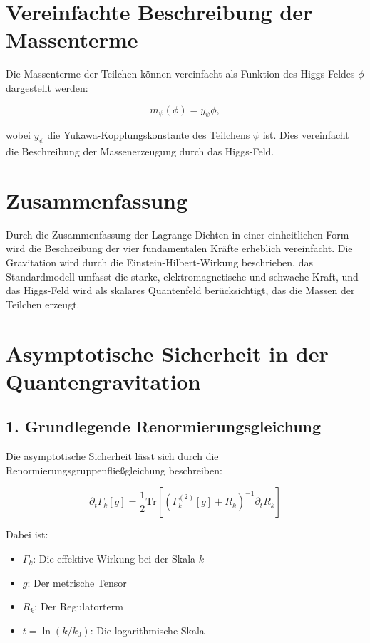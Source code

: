 \documentclass{article}
\begin{document}
	\section{Vereinfachte Beschreibung der Massenterme}
	
	Die Massenterme der Teilchen können vereinfacht als Funktion des Higgs-Feldes $\phi$ dargestellt werden:
	
	\begin{equation}
		m_\psi(\phi) = y_\psi \phi,
	\end{equation}
	
	wobei $y_\psi$ die Yukawa-Kopplungskonstante des Teilchens $\psi$ ist. Dies vereinfacht die Beschreibung der Massenerzeugung durch das Higgs-Feld.
	
	\section{Zusammenfassung}
	
	Durch die Zusammenfassung der Lagrange-Dichten in einer einheitlichen Form wird die Beschreibung der vier fundamentalen Kräfte erheblich vereinfacht. Die Gravitation wird durch die Einstein-Hilbert-Wirkung beschrieben, das Standardmodell umfasst die starke, elektromagnetische und schwache Kraft, und das Higgs-Feld wird als skalares Quantenfeld berücksichtigt, das die Massen der Teilchen erzeugt.
\section{Asymptotische Sicherheit in der Quantengravitation}

\subsection{1. Grundlegende Renormierungsgleichung}

Die asymptotische Sicherheit lässt sich durch die Renormierungsgruppenfließgleichung beschreiben:

\[
\partial_t \Gamma_k[g] = \frac{1}{2} \text{Tr}\left[\left(\Gamma_k^{(2)}[g] + R_k\right)^{-1} \partial_t R_k\right]
\]

Dabei ist:

\begin{itemize}
	\item $\Gamma_k$: Die effektive Wirkung bei der Skala $k$
	\item $g$: Der metrische Tensor
	\item $R_k$: Der Regulatorterm
	\item $t = \ln(k/k_0)$: Die logarithmische Skala
\end{itemize}
\end{document}
